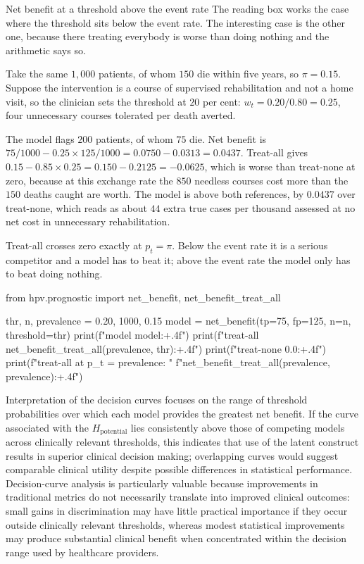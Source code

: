 \begin{workedexample}{Net benefit at a threshold above the event rate}
The reading box works the case where the threshold sits below the event rate.
The interesting case is the other one, because there treating everybody is
worse than doing nothing and the arithmetic says so.

Take the same $1{,}000$ patients, of whom $150$ die within five years, so
$\pi=0.15$. Suppose the intervention is a course of supervised rehabilitation
and not a home visit, so the clinician sets the threshold at $20$ per cent:
$w_t=0.20/0.80=0.25$, four unnecessary courses tolerated per death averted.

The model flags $200$ patients, of whom $75$ die. Net benefit is
$75/1000-0.25\times125/1000=0.0750-0.0313=0.0437$. Treat-all gives
$0.15-0.85\times0.25=0.150-0.2125=-0.0625$, which is worse than treat-none at
zero, because at this exchange rate the $850$ needless courses cost more than
the $150$ deaths caught are worth. The model is above both references, by
$0.0437$ over treat-none, which reads as about $44$ extra true cases per
thousand assessed at no net cost in unnecessary rehabilitation.

Treat-all crosses zero exactly at $p_t=\pi$. Below the event rate it is a
serious competitor and a model has to beat it; above the event rate the model
only has to beat doing nothing.

\begin{wecode}[Python]
from hpv.prognostic import net_benefit, net_benefit_treat_all

thr, n, prevalence = 0.20, 1000, 0.15
model = net_benefit(tp=75, fp=125, n=n, threshold=thr)
print(f"model      {model:+.4f}")
print(f"treat-all  {net_benefit_treat_all(prevalence, thr):+.4f}")
print(f"treat-none {0.0:+.4f}")
print(f"treat-all at p_t = prevalence: "
      f"{net_benefit_treat_all(prevalence, prevalence):+.4f}")
\end{wecode}

\end{workedexample}

Interpretation of the decision curves focuses on the range of threshold probabilities over which each model provides the greatest net benefit. If the curve associated with the $H_{\text{potential}}$ lies consistently above those of competing models across clinically relevant thresholds, this indicates that use of the latent construct results in superior clinical decision making; overlapping curves would suggest comparable clinical utility despite possible differences in statistical performance. Decision-curve analysis is particularly valuable because improvements in traditional metrics do not necessarily translate into improved clinical outcomes: small gains in discrimination may have little practical importance if they occur outside clinically relevant thresholds, whereas modest statistical improvements may produce substantial clinical benefit when concentrated within the decision range used by healthcare providers.

